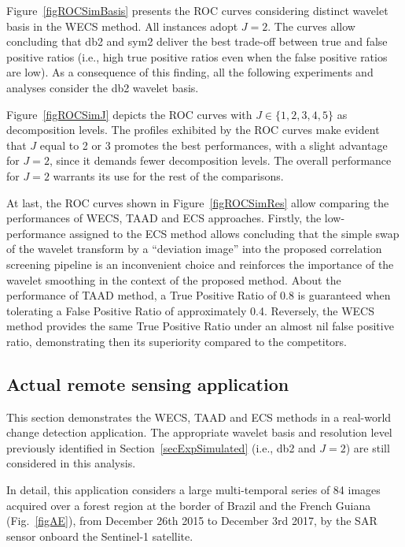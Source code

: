 \documentclass[journal]{IEEEtran}
\begin{document}
Figure~\ref{figROCSimBasis} presents the ROC curves considering distinct wavelet basis in the WECS method. All instances adopt $J=2$. The curves allow concluding that db2 and sym2 deliver the best trade-off between true and false positive ratios (i.e., high true positive ratios even when the false positive ratios are low).
As a consequence of this finding, all the following experiments and analyses consider the db2 wavelet basis.

Figure~\ref{figROCSimJ} depicts the ROC curves with $J \in \{1,2,3,4,5\}$ as decomposition levels. The profiles exhibited by the ROC curves make evident that $J$ equal to 2 or 3 promotes the best performances, with a slight advantage for $J=2$, since it demands fewer decomposition levels. The overall performance for $J=2$ warrants its use for the rest of the comparisons.

At last, the ROC curves shown in Figure~\ref{figROCSimRes} allow comparing the performances of WECS, TAAD and ECS approaches. 
Firstly, the low-performance assigned to the ECS method allows concluding that the simple swap of the wavelet transform by a ``deviation image'' into the proposed correlation screening pipeline is an inconvenient choice and reinforces the importance of the wavelet smoothing in the context of the proposed method.
About the performance of TAAD method, a True Positive Ratio of 0.8 is guaranteed when tolerating a False Positive Ratio of approximately 0.4. 
Reversely, the WECS method provides the same True Positive Ratio under an almost nil false positive ratio, demonstrating then its superiority compared to the competitors.


\subsection{Actual remote sensing application}\label{secExpActual}


This section demonstrates the WECS, TAAD and ECS methods in a real-world change detection application. The appropriate wavelet basis and resolution level previously identified in Section~\ref{secExpSimulated} (i.e., db2 and $J=2$) are still considered in this analysis.

In detail, this application considers a large multi-temporal series of 84 images acquired over a forest region at the border of Brazil and the French Guiana (Fig.~\ref{figAE}), from December 26th 2015 to December 3rd 2017, by the SAR sensor onboard the Sentinel-1 satellite.
\end{document}
